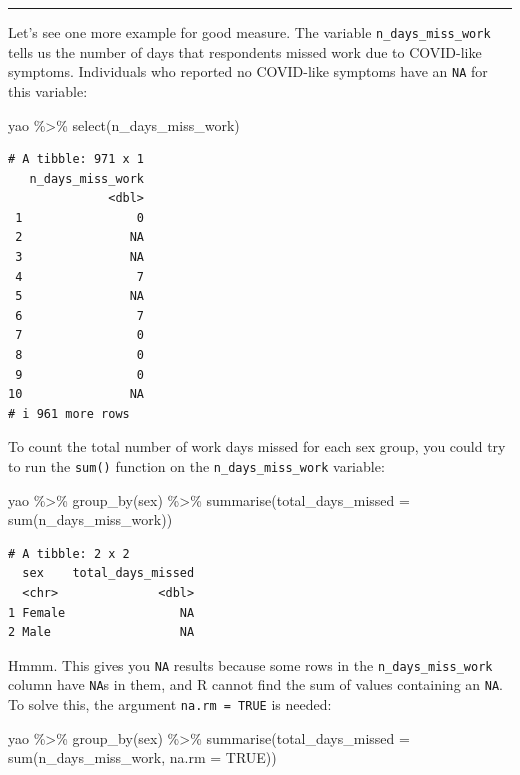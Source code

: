 \documentclass[
  letterpaper,
  DIV=11,
  numbers=noendperiod]{scrreprt}
\newenvironment{Shaded}{\begin{snugshade}}{\end{snugshade}}
\newcommand{\AttributeTok}[1]{\textcolor[rgb]{0.40,0.45,0.13}{#1}}
\newcommand{\ConstantTok}[1]{\textcolor[rgb]{0.56,0.35,0.01}{#1}}
\newcommand{\FunctionTok}[1]{\textcolor[rgb]{0.28,0.35,0.67}{#1}}
\newcommand{\NormalTok}[1]{\textcolor[rgb]{0.00,0.23,0.31}{#1}}
\newcommand{\SpecialCharTok}[1]{\textcolor[rgb]{0.37,0.37,0.37}{#1}}
\begin{document}
\begin{center}\rule{0.5\linewidth}{0.5pt}\end{center}

Let's see one more example for good measure. The variable
\texttt{n\_days\_miss\_work} tells us the number of days that
respondents missed work due to COVID-like symptoms. Individuals who
reported no COVID-like symptoms have an \texttt{NA} for this variable:

\begin{Shaded}
\begin{Highlighting}[]
\NormalTok{yao }\SpecialCharTok{\%\textgreater{}\%} 
  \FunctionTok{select}\NormalTok{(n\_days\_miss\_work)}
\end{Highlighting}
\end{Shaded}

\begin{verbatim}
# A tibble: 971 x 1
   n_days_miss_work
              <dbl>
 1                0
 2               NA
 3               NA
 4                7
 5               NA
 6                7
 7                0
 8                0
 9                0
10               NA
# i 961 more rows
\end{verbatim}

To count the total number of work days missed for each sex group, you
could try to run the \texttt{sum()} function on the
\texttt{n\_days\_miss\_work} variable:

\begin{Shaded}
\begin{Highlighting}[]
\NormalTok{yao }\SpecialCharTok{\%\textgreater{}\%} 
  \FunctionTok{group\_by}\NormalTok{(sex) }\SpecialCharTok{\%\textgreater{}\%} 
  \FunctionTok{summarise}\NormalTok{(}\AttributeTok{total\_days\_missed =} \FunctionTok{sum}\NormalTok{(n\_days\_miss\_work))}
\end{Highlighting}
\end{Shaded}

\begin{verbatim}
# A tibble: 2 x 2
  sex    total_days_missed
  <chr>              <dbl>
1 Female                NA
2 Male                  NA
\end{verbatim}

Hmmm. This gives you \texttt{NA} results because some rows in the
\texttt{n\_days\_miss\_work} column have \texttt{NA}s in them, and R
cannot find the sum of values containing an \texttt{NA}. To solve this,
the argument \texttt{na.rm\ =\ TRUE} is needed:

\begin{Shaded}
\begin{Highlighting}[]
\NormalTok{yao }\SpecialCharTok{\%\textgreater{}\%} 
  \FunctionTok{group\_by}\NormalTok{(sex) }\SpecialCharTok{\%\textgreater{}\%} 
  \FunctionTok{summarise}\NormalTok{(}\AttributeTok{total\_days\_missed =} \FunctionTok{sum}\NormalTok{(n\_days\_miss\_work, }\AttributeTok{na.rm =} \ConstantTok{TRUE}\NormalTok{))}
\end{Highlighting}
\end{Shaded}
\end{document}

